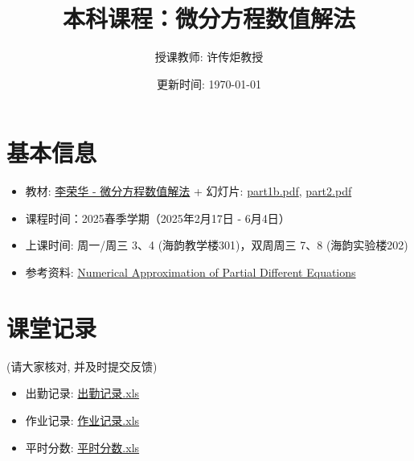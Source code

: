 \documentclass[a4paper,11pt]{article}
\title{本科课程：微分方程数值解法}
\author{授课教师: 许传炬教授}
\date{更新时间: \today}
\begin{document}
\maketitle

\vspace{-3em}

\section*{\large 基本信息}
\vspace{-1em}

\begin{itemize}
\item 教材: \href{https://wanghuaijin.github.io/assets/numDEs/LiRonghua.pdf}{李荣华 - 微分方程数值解法} + 幻灯片: \href{https://wanghuaijin.github.io/assets/numDEs/part1b.pdf}{part1b.pdf}, \href{https://wanghuaijin.github.io/assets/numDEs/part2.pdf}{part2.pdf}
\vspace{-1em}
\item 课程时间：2025春季学期（2025年2月17日 - 6月4日）
\vspace{-1em}
\item 上课时间: 周一/周三 3、4 (海韵教学楼301)，双周周三 7、8 (海韵实验楼202)
\vspace{-1em}
\item 参考资料: \href{https://wanghuaijin.github.io/assets/numDEs/Alfio1994.pdf}{Numerical Approximation of Partial Different Equations}
\end{itemize}

\vspace{-2em}

\section*{\large 课堂记录}
\vspace{-1em}

(请大家核对, 并及时提交反馈)

\vspace{-1em}
\begin{itemize}
\item 出勤记录: \href{https://wanghuaijin.github.io/assets/numDEs/status/attendance.xlsx}{出勤记录.xls}
\vspace{-1em}
\item 作业记录: \href{https://wanghuaijin.github.io/assets/numDEs/status/homework.xlsx}{作业记录.xls}
\vspace{-1em}
\item 平时分数: \href{https://wanghuaijin.github.io/assets/numDEs/status/evaluation.xlsx}{平时分数.xls}
\end{itemize}
\end{document}
